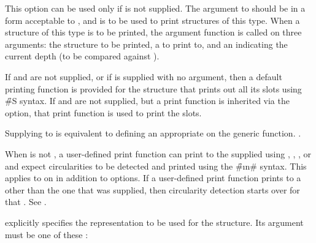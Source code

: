 
This option can be used only if 
is not supplied.
The argument to  
should be 
in a form acceptable to , and is
to be used to print structures of this type.
When a structure of this type is to be printed, the argument function
is called on three arguments:
the structure to be printed, a  to print to,
and an  
indicating the current depth (to be compared against
).

If  and 
are not supplied, or if 
is supplied with no argument,  then a default printing function is
provided for the structure that prints out all its slots
using \f{\#S} syntax.
If  and 
are not supplied, but a print function is inherited via the 
option, that print function is used to print the slots.

Supplying  to  is equivalent
to defining an appropriate  
on the  generic function. \Seesection\IntroToMethods.

When  is not \nil, a user-defined print function can print
to the supplied  using 
, , , or 
and expect circularities to be detected and printed using the
\f{\#\i{n}\#} syntax.
This applies to  on  in addition to
 options. If a user-defined print function prints to a 
 other than the one
that was supplied, then circularity detection starts over for that
. 
See .
 


 explicitly specifies the representation to be used for
the structure.  Its argument must be one of these :

